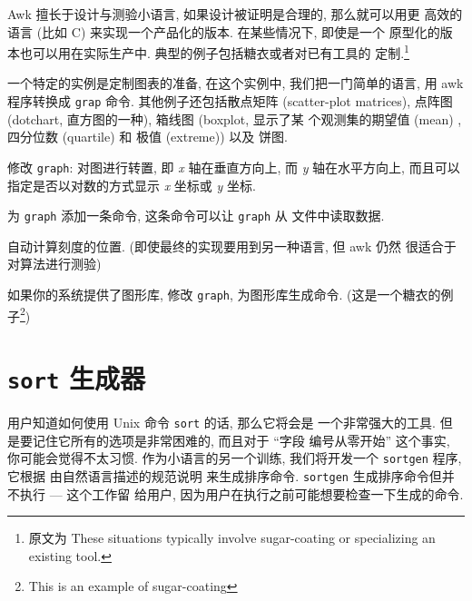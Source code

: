 Awk 擅长于设计与测验小语言, 如果设计被证明是合理的, 那么就可以用更
高效的语言 (比如 C) 来实现一个产品化的版本. 在某些情况下, 即使是一个
原型化的版本也可以用在实际生产中. 典型的例子包括糖衣或者对已有工具的
定制.\footnote{原文为 These situations typically involve sugar-coating or
specializing an existing tool.}

一个特定的实例是定制图表的准备, 在这个实例中, 我们把一门简单的语言, 用
awk 程序转换成 \texttt{grap} 命令. 其他例子还包括散点矩阵 (scatter-plot
matrices), 点阵图 (dotchart, 直方图的一种), 箱线图 (boxplot, 显示了某
个观测集的期望值 (mean) , 四分位数 (quartile) 和 极值 (extreme)) 以及
饼图.

\begin{exercise}
    \label{exer:zhuangzhi}
    修改 \texttt{graph}: 对图进行转置, 即 \textit{x} 轴在垂直方向上,
    而 \textit{y} 轴在水平方向上, 而且可以指定是否以对数的方式显示
    \textit{x} 坐标或 \textit{y} 坐标.
\end{exercise}

\begin{exercise}
    为 \texttt{graph} 添加一条命令, 这条命令可以让 \texttt{graph} 从
    文件中读取数据.
\end{exercise}

\begin{exercise}
    自动计算刻度的位置. (即使最终的实现要用到另一种语言, 但 awk 仍然
    很适合于对算法进行测验)
\end{exercise}

\begin{exercise}
    如果你的系统提供了图形库, 修改 \texttt{graph}, 为图形库生成命令.
    (这是一个糖衣的例子\footnote{This is an example of sugar-coating})
\end{exercise}

\section{\textbf{\texttt{sort}} 生成器}
\label{sec:a_sort_generator}

 用户知道如何使用 Unix 命令 \texttt{sort} 的话, 那么它将会是
一个非常强大的工具. 但是要记住它所有的选项是非常困难的, 而且对于 ``字段
编号从零开始'' 这个事实, 你可能会觉得不太习惯. 作为小语言的另一个训练,
我们将开发一个 \texttt{sortgen} 程序, 它根据 由自然语言描述的规范说明
来生成排序命令. \texttt{sortgen} 生成排序命令但并不执行 --- 这个工作留
给用户, 因为用户在执行之前可能想要检查一下生成的命令.

